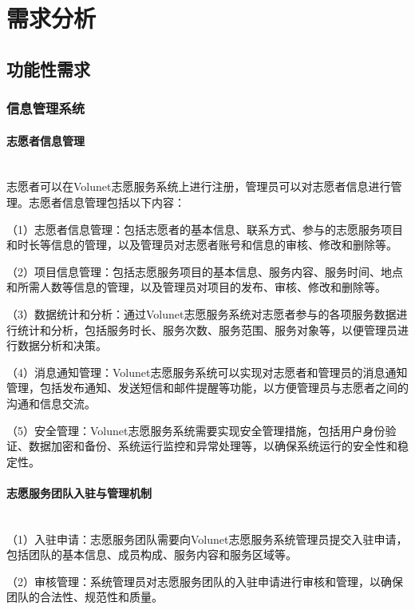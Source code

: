 \section{需求分析}
\subsection{功能性需求}


\subsubsection{信息管理系统}

\paragraph{志愿者信息管理}~{}
\\

志愿者可以在Volunet志愿服务系统上进行注册，管理员可以对志愿者信息进行管理。志愿者信息管理包括以下内容：

（1）志愿者信息管理：包括志愿者的基本信息、联系方式、参与的志愿服务项目和时长等信息的管理，以及管理员对志愿者账号和信息的审核、修改和删除等。

（2）项目信息管理：包括志愿服务项目的基本信息、服务内容、服务时间、地点和所需人数等信息的管理，以及管理员对项目的发布、审核、修改和删除等。

（3）数据统计和分析：通过Volunet志愿服务系统对志愿者参与的各项服务数据进行统计和分析，包括服务时长、服务次数、服务范围、服务对象等，以便管理员进行数据分析和决策。

（4）消息通知管理：Volunet志愿服务系统可以实现对志愿者和管理员的消息通知管理，包括发布通知、发送短信和邮件提醒等功能，以方便管理员与志愿者之间的沟通和信息交流。

（5）安全管理：Volunet志愿服务系统需要实现安全管理措施，包括用户身份验证、数据加密和备份、系统运行监控和异常处理等，以确保系统运行的安全性和稳定性。

\paragraph{志愿服务团队入驻与管理机制}~{}
\\

（1）入驻申请：志愿服务团队需要向Volunet志愿服务系统管理员提交入驻申请，包括团队的基本信息、成员构成、服务内容和服务区域等。


（2）审核管理：系统管理员对志愿服务团队的入驻申请进行审核和管理，以确保团队的合法性、规范性和质量。

